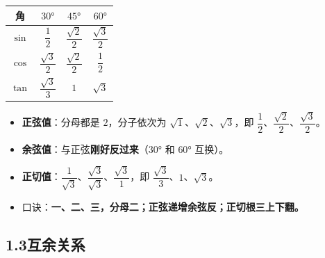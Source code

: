 \documentclass[12pt, a4paper]{ctexart}
\begin{document}
\bigskip
\begin{center}
\renewcommand{\arraystretch}{2.0}
\begin{tabular}{|c|c|c|c|}
\hline
\textbf{角} & $30°$ & $45°$ & $60°$ \\
\hline
$\sin$ & $\dfrac{1}{2}$ & $\dfrac{\sqrt{2}}{2}$ & $\dfrac{\sqrt{3}}{2}$ \\
\hline
$\cos$ & $\dfrac{\sqrt{3}}{2}$ & $\dfrac{\sqrt{2}}{2}$ & $\dfrac{1}{2}$ \\
\hline
$\tan$ & $\dfrac{\sqrt{3}}{3}$ & $1$ & $\sqrt{3}$ \\
\hline
\end{tabular}
\end{center}

\begin{tipbox}[记忆技巧]
\begin{itemize}[nosep, leftmargin=1.5em]
  \item \textbf{正弦值}：分母都是 $2$，分子依次为 $\sqrt{1}$、$\sqrt{2}$、$\sqrt{3}$，即 $\dfrac{1}{2}$、$\dfrac{\sqrt{2}}{2}$、$\dfrac{\sqrt{3}}{2}$。
  \item \textbf{余弦值}：与正弦\textbf{刚好反过来}（$30°$ 和 $60°$ 互换）。
  \item \textbf{正切值}：$\dfrac{1}{\sqrt{3}}$、$\dfrac{\sqrt{3}}{\sqrt{3}}$、$\dfrac{\sqrt{3}}{1}$，即 $\dfrac{\sqrt{3}}{3}$、$1$、$\sqrt{3}$。
  \item 口诀：\textbf{一、二、三，分母二；正弦递增余弦反；正切根三上下翻。}
\end{itemize}
\end{tipbox}

\subsection*{1.3\quad 互余关系}
\end{document}
